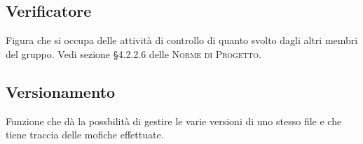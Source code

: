 \documentclass[../glossario.tex]{subfiles}
\begin{document}
\subsection*{Verificatore} 
Figura che si occupa delle attività di controllo di quanto svolto dagli altri membri del gruppo. Vedi sezione \S4.2.2.6 delle \textsc{Norme di Progetto}.

\subsection*{Versionamento} 
Funzione che dà la possbilità di gestire le varie versioni di uno stesso file e che tiene traccia delle mofiche effettuate.
\end{document}
